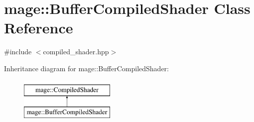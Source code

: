 \hypertarget{classmage_1_1_buffer_compiled_shader}{}\section{mage\+:\+:Buffer\+Compiled\+Shader Class Reference}
\label{classmage_1_1_buffer_compiled_shader}


{\ttfamily \#include $<$compiled\+\_\+shader.\+hpp$>$}

Inheritance diagram for mage\+:\+:Buffer\+Compiled\+Shader\+:\begin{figure}[H]
\begin{center}
\leavevmode
\includegraphics[height=2.000000cm]{classmage_1_1_buffer_compiled_shader}
\end{center}
\end{figure}

